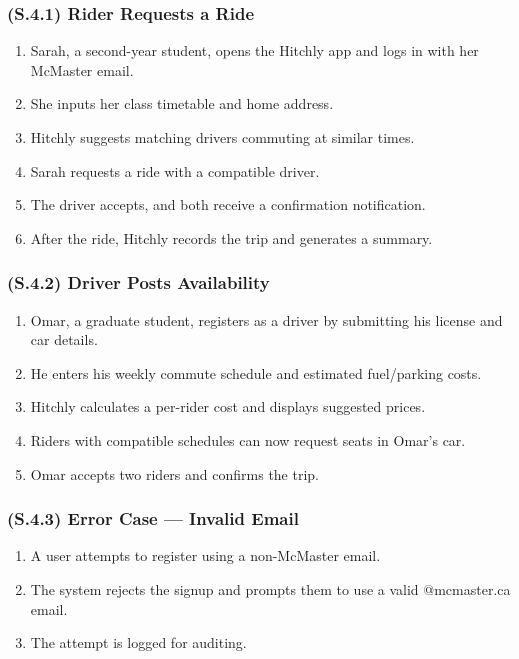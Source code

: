 \documentclass[12pt,letterpaper]{article}
\begin{document}
\subsubsection{(S.4.1) Rider Requests a Ride} %
\begin{enumerate}
    \item Sarah, a second-year student, opens the Hitchly app and logs in with her McMaster email.
    \item She inputs her class timetable and home address.
    \item Hitchly suggests matching drivers commuting at similar times.
    \item Sarah requests a ride with a compatible driver.
    \item The driver accepts, and both receive a confirmation notification.
    \item After the ride, Hitchly records the trip and generates a summary.
\end{enumerate}

\subsubsection{(S.4.2) Driver Posts Availability} %
\begin{enumerate}
    \item Omar, a graduate student, registers as a driver by submitting his license and car details.
    \item He enters his weekly commute schedule and estimated fuel/parking costs.
    \item Hitchly calculates a per-rider cost and displays suggested prices.
    \item Riders with compatible schedules can now request seats in Omar’s car.
    \item Omar accepts two riders and confirms the trip.
\end{enumerate}

\subsubsection{(S.4.3) Error Case — Invalid Email} %
\begin{enumerate}
    \item A user attempts to register using a non-McMaster email.
    \item The system rejects the signup and prompts them to use a valid @mcmaster.ca email.
    \item The attempt is logged for auditing.
\end{enumerate}
\end{document}

